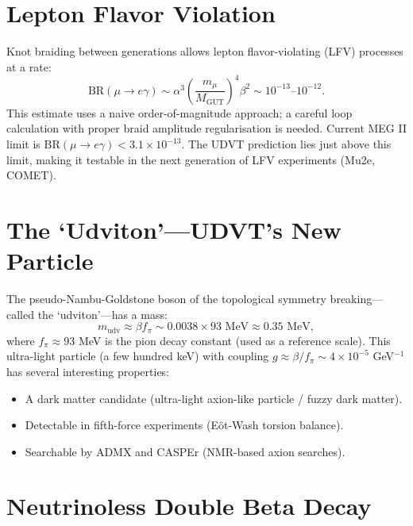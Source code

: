 \documentclass[12pt,a4paper]{book}
\theoremstyle{definition}
\theoremstyle{remark}
\begin{document}
\section{Lepton Flavor Violation}

Knot braiding between generations allows lepton flavor-violating (LFV) processes at a rate:
\begin{equation}
    \mathrm{BR}(\mu \rightarrow e\gamma) \sim \alpha^3 \left(\frac{m_\mu}{M_{\mathrm{GUT}}}\right)^4 \beta^2 \sim 10^{-13} \text{--} 10^{-12}.
\end{equation}
This estimate uses a naive order-of-magnitude approach; a careful loop calculation with proper braid amplitude regularisation is needed. Current MEG II limit is $\mathrm{BR}(\mu \rightarrow e\gamma) < 3.1 \times 10^{-13}$. The UDVT prediction lies just above this limit, making it testable in the next generation of LFV experiments (Mu2e, COMET).

\section{The `Udviton'---UDVT's New Particle}

The pseudo-Nambu-Goldstone boson of the topological symmetry breaking---called the `udviton'---has a mass:
\begin{equation}
    m_{\mathrm{udv}} \approx \beta f_\pi \sim 0.0038 \times 93 \text{ MeV} \approx 0.35 \text{ MeV},
\end{equation}
where $f_\pi \approx 93$ MeV is the pion decay constant (used as a reference scale). This ultra-light particle (a few hundred keV) with coupling $g \approx \beta/f_\pi \sim 4 \times 10^{-5}$ GeV$^{-1}$ has several interesting properties:
\begin{itemize}
    \item A dark matter candidate (ultra-light axion-like particle / fuzzy dark matter).
    \item Detectable in fifth-force experiments (E\"ot-Wash torsion balance).
    \item Searchable by ADMX and CASPEr (NMR-based axion searches).
\end{itemize}

\section{Neutrinoless Double Beta Decay}
\end{document}
